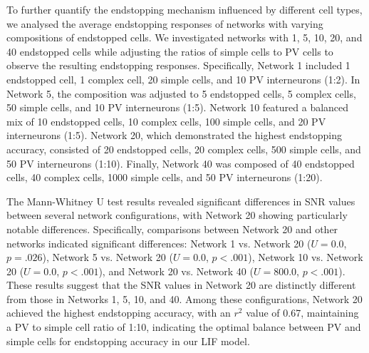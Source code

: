\documentclass[12pt]{article}
\begin{document}
To further quantify the endstopping mechanism influenced by different cell types, we analysed the average endstopping responses of networks with varying compositions of endstopped cells. We investigated networks with 1, 5, 10, 20, and 40 endstopped cells while adjusting the ratios of simple cells to PV cells to observe the resulting endstopping responses. Specifically, Network 1 included 1 endstopped cell, 1 complex cell, 20 simple cells, and 10 PV interneurons (1:2). In Network 5, the composition was adjusted to 5 endstopped cells, 5 complex cells, 50 simple cells, and 10 PV interneurons (1:5). Network 10 featured a balanced mix of 10 endstopped cells, 10 complex cells, 100 simple cells, and 20 PV interneurons (1:5). Network 20, which demonstrated the highest endstopping accuracy, consisted of 20 endstopped cells, 20 complex cells, 500 simple cells, and 50 PV interneurons (1:10). Finally, Network 40 was composed of 40 endstopped cells, 40 complex cells, 1000 simple cells, and 50 PV interneurons (1:20).

The Mann-Whitney U test results revealed significant differences in SNR values between several network configurations, with Network 20 showing particularly notable differences. Specifically, comparisons between Network 20 and other networks indicated significant differences: Network 1 vs. Network 20 ($U = 0.0$, $p = .026$), Network 5 vs. Network 20 ($U = 0.0$, $p < .001$), Network 10 vs. Network 20 ($U = 0.0$, $p < .001$), and Network 20 vs. Network 40 ($U = 800.0$, $p < .001$). These results suggest that the SNR values in Network 20 are distinctly different from those in Networks 1, 5, 10, and 40. Among these configurations, Network 20 achieved the highest endstopping accuracy, with an $r^2$ value of 0.67, maintaining a PV to simple cell ratio of 1:10, indicating the optimal balance between PV and simple cells for endstopping accuracy in our LIF model.
\end{document}
